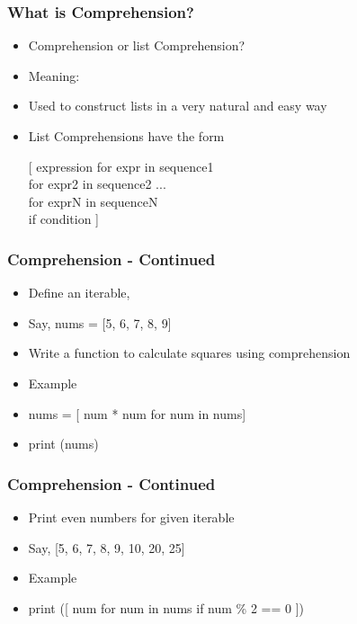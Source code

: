 \documentclass[14pt]{beamer}
\begin{document}
    \begin{frame}[containsverbatim]
        \frametitle{What is Comprehension?}
		\begin{itemize}
		\item Comprehension or list Comprehension?
        \item \alert{Meaning:}
        \item Used to construct lists in a very
natural and easy way
		\item List Comprehensions have the form
		
		[ expression for expr in sequence1 \\
		  for expr2 in sequence2 ... \\
		  for exprN in sequenceN \\
		  if condition ] \\
        \end{itemize}
    \end{frame}

    \begin{frame}[containsverbatim]
        \frametitle{Comprehension - Continued}
		\begin{itemize}
		\item Define an iterable, 
		\item Say, nums = [5, 6, 7, 8, 9]
		\item Write a function to calculate squares using comprehension
        \item \alert{Example}
        \item nums = [ num * num for num in nums]
		\item print (nums)
        \end{itemize}
    \end{frame}

    \begin{frame}[containsverbatim]
        \frametitle{Comprehension - Continued}
		\begin{itemize}
		\item Print even numbers for given iterable
		\item Say, [5, 6, 7, 8, 9, 10, 20, 25]
        \item \alert{Example}
        \item print ([ num for num in nums if num \% 2 == 0 ])
        \end{itemize}
    \end{frame}
    
\end{document}
